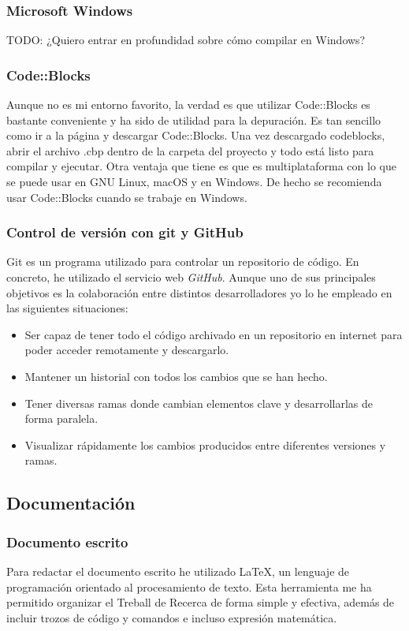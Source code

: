 \subsubsection{Microsoft Windows}
TODO: ¿Quiero entrar en profundidad sobre cómo compilar en Windows?

\subsubsection{Code::Blocks}
Aunque no es mi entorno favorito, la verdad es que utilizar Code::Blocks es bastante conveniente y ha sido de utilidad para la depuración. Es tan sencillo como ir a la página y descargar Code::Blocks. Una vez descargado codeblocks, abrir el archivo .cbp dentro de la carpeta del proyecto y todo está listo para compilar y ejecutar. Otra ventaja que tiene es que es multiplataforma con lo que se puede usar en GNU Linux, macOS y en Windows. De hecho se recomienda usar Code::Blocks cuando se trabaje en Windows.

\subsubsection{Control de versión con git y GitHub}
Git es un programa utilizado para controlar un repositorio de código. En concreto, he utilizado el servicio web \textit{GitHub}. Aunque uno de sus principales objetivos es la colaboración entre distintos desarrolladores yo lo he empleado en las siguientes situaciones:
\begin{itemize}
\item{Ser capaz de tener todo el código archivado en un repositorio en internet para poder acceder remotamente y descargarlo.}
\item{Mantener un historial con todos los cambios que se han hecho.}
\item{Tener diversas ramas donde cambian elementos clave y desarrollarlas de forma paralela.}
\item{Visualizar rápidamente los cambios producidos entre diferentes versiones y ramas.}
\end{itemize}
\subsection{Documentación}
\subsubsection{Documento escrito}
Para redactar el documento escrito he utilizado \LaTeX, un lenguaje de programación orientado al procesamiento de texto. Esta herramienta me ha permitido organizar el Treball de Recerca de forma simple y efectiva, además de incluir trozos de código y comandos e incluso expresión matemática.
